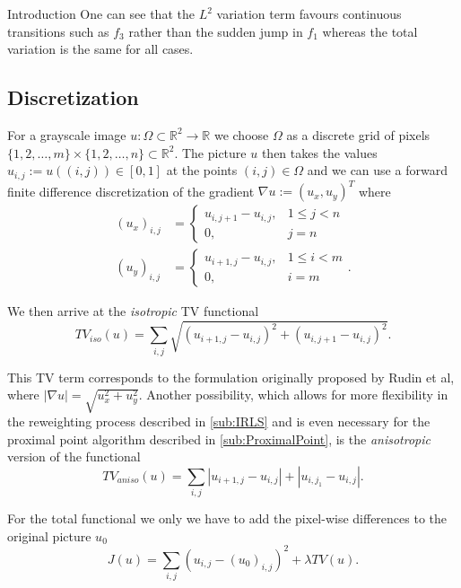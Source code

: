 \begin{chapter}{Introduction}
One can see that the $L^2$ variation term favours continuous transitions such as $f_3$ rather than the sudden jump in $f_1$ whereas the total variation is the same for
all cases.


\subsection{Discretization} %
\label{sub:Discretization}
For a grayscale image $u:\Omega\subset\mathbb{R}^2\to\mathbb{R}$ we choose $\Omega$ as a discrete grid of pixels 
$\lbrace 1,2,\ldots,m\rbrace\times\lbrace1,2,\ldots,n\rbrace\subset\mathbb{R}^2$. The picture $u$ then takes the values $u_{i,j}:=u((i,j))\in [0,1]$
at the points $(i,j)\in\Omega$ and we can use a forward finite difference discretization of the gradient $\nabla u:=(u_x,u_y)^T$ where
\begin{align}
    (u_x)_{i,j} &= 
	\begin{cases}
	u_{i,j+1}-u_{i,j}, & 1\leq j < n \\
	0, & j=n 
	\end{cases} \\
    (u_y)_{i,j} &= 
	\begin{cases}
	u_{i+1,j}-u_{i,j}, & 1\leq i < m \\
	0, &i=m
	\end{cases}.\nonumber
\end{align}

We then arrive at the \emph{isotropic} TV functional
\begin{equation}
    \label{eq:original_isofunctional}
    TV_{iso}(u)=\sum_{i,j}\sqrt{(u_{i+1,j}-u_{i,j})^{2}+(u_{i,j+1}-u_{i,j})^{2}}.
\end{equation}

This TV term corresponds to the formulation originally proposed by Rudin et al\cite{RudinOsher}, where $\left\vert\nabla u\right\vert=\sqrt{u_x^{2}+u_y^{2} }$.
Another possibility, which allows for more flexibility in the reweighting process described in \ref{sub:IRLS} and is even necessary
for the proximal point algorithm described in \ref{sub:ProximalPoint}, is the \emph{anisotropic} version of the functional
\begin{equation}
    \label{eq:original_anisofunctional}
    TV_{aniso}(u)=\sum_{i,j}|u_{i+1,j}-u_{i,j}|+|u_{i,j_1}-u_{i,j}|.
\end{equation}

For the total functional we only we have to add the pixel-wise differences to the original picture $u_0$
\begin{equation}
    \label{eq:original_functional}
    J(u)=\sum_{i,j}(u_{i,j}-(u_0)_{i,j})^2 + \lambda TV(u).
\end{equation}



\end{chapter}
